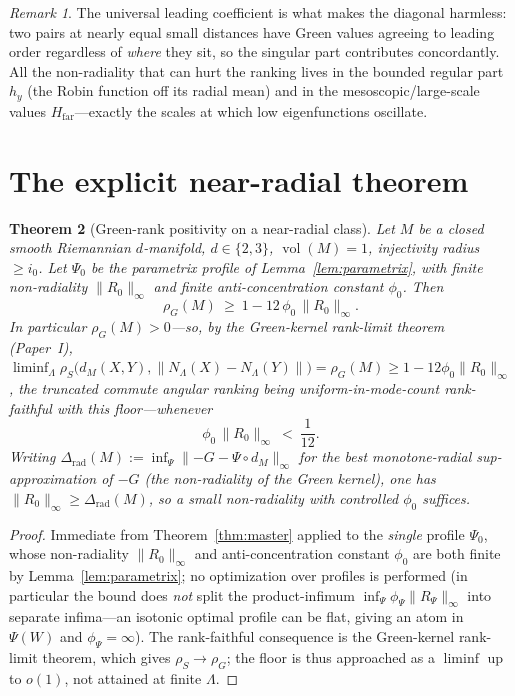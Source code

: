 \documentclass[11pt]{article}
\newtheorem{theorem}{Theorem}
\theoremstyle{remark}
\newtheorem{remark}[theorem]{Remark}
\newcommand{\vol}{\operatorname{vol}}
\newcommand{\Rem}{R}
\newcommand{\dM}{d_M}
\newcommand{\rhoG}{\rho_G}
\begin{document}
\begin{remark}
The universal leading coefficient is what makes the diagonal harmless: two pairs at nearly
equal small distances have Green values agreeing to leading order regardless of
\emph{where} they sit, so the singular part contributes concordantly. All the
non-radiality that can hurt the ranking lives in the bounded regular part $h_y$ (the Robin
function off its radial mean) and in the mesoscopic/large-scale values
$H_{\mathrm{far}}$---exactly the scales at which low eigenfunctions oscillate.
\end{remark}

\section{The explicit near-radial theorem}

\begin{theorem}[Green-rank positivity on a near-radial class]\label{thm:nearradial}
Let $M$ be a closed smooth Riemannian $d$-manifold, $d\in\{2,3\}$, $\vol(M)=1$, injectivity
radius $\ge i_0$. Let $\Psi_0$ be the parametrix profile of Lemma~\ref{lem:parametrix},
with finite non-radiality $\lVert\Rem_0\rVert_\infty$ and finite anti-concentration
constant $\phi_0$. Then
\[
\rhoG(M)\ \ge\ 1-12\,\phi_0\,\lVert\Rem_0\rVert_\infty .
\]
In particular $\rhoG(M)>0$---so, by the Green-kernel rank-limit theorem (Paper~I),
$\liminf_{\Lambda}\rho_S\bigl(\dM(X,Y),\lVert N_\Lambda(X)-N_\Lambda(Y)\rVert\bigr)=\rhoG(M)
\ge1-12\phi_0\lVert\Rem_0\rVert_\infty$, the truncated commute angular ranking being
uniform-in-mode-count rank-faithful with this floor---whenever
\[
\phi_0\,\lVert\Rem_0\rVert_\infty\ <\ \frac{1}{12}.
\]
Writing $\Delta_{\mathrm{rad}}(M):=\inf_{\Psi}\lVert{-}G-\Psi\circ\dM\rVert_\infty$ for the
best monotone-radial sup-approximation of $-G$ (the non-radiality of the Green kernel),
one has $\lVert\Rem_0\rVert_\infty\ge\Delta_{\mathrm{rad}}(M)$, so a small non-radiality
with controlled $\phi_0$ suffices.
\end{theorem}

\begin{proof}
Immediate from Theorem~\ref{thm:master} applied to the \emph{single} profile $\Psi_0$,
whose non-radiality $\lVert\Rem_0\rVert_\infty$ and anti-concentration constant $\phi_0$
are both finite by Lemma~\ref{lem:parametrix}; no optimization over profiles is performed
(in particular the bound does \emph{not} split the product-infimum
$\inf_\Psi\phi_\Psi\lVert\Rem_\Psi\rVert_\infty$ into separate infima---an isotonic
optimal profile can be flat, giving an atom in $\Psi(W)$ and $\phi_\Psi=\infty$). The
rank-faithful consequence is the Green-kernel rank-limit theorem, which gives
$\rho_S\to\rhoG$; the floor is thus approached as a $\liminf$ up to $o(1)$, not attained
at finite $\Lambda$.
\end{proof}
\end{document}
